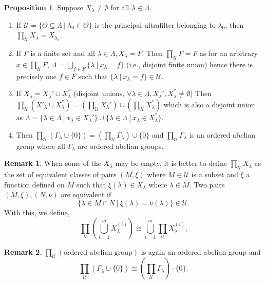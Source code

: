 \documentclass[10pt]{article}
\numberwithin{equation}{section}
\theoremstyle{definition}
\newtheorem{proposition}{Proposition}[subsection]
\newtheorem{remark}{Remark}[subsection]
\newcommand{\U}[0]{\mathcal{U}}
\newcommand{\sep}[0]{\:|\:}
\begin{document}
\begin{proposition}
    \label{fact_5_2}
    Suppose $X_\lambda\not=\emptyset$ for all $\lambda\in\Lambda$.
    \begin{enumerate}
        \item If $\U=\{\Theta\subseteq\Lambda\sep\lambda_0\in\Theta\}$ is the principal ultrafilter belonging to $\lambda_0$, then $\prod_\U X_\lambda=X_{\lambda_0}$.
        \item If $F$ is a finite set and all $\lambda\in\Lambda,X_\lambda=F$. Then $\prod_\U F = F$ as for an arbitrary $x\in\prod_\U F$, $\Lambda = \bigcup_{f\in F}\{\lambda\sep x_\lambda =f\}$ (i.e., disjoint finite union) hence there is precisely one $f\in F$ such that $\{\lambda\sep x_\lambda=f\}\in\U$.
        \item If $X_\lambda = X_\lambda'\cup X_\lambda^{''}$ (disjoint unions, $\forall \lambda\in\Lambda, X_\lambda',X^{''}_\lambda\not=\emptyset$) Then $\prod_{\U}(X'_\lambda\cup X^{''}_\lambda) = (\prod_\U X_\lambda')\cup(\prod_\U X^{''}_\lambda)$ which is also a disjoint union as $\Lambda = \{\lambda\in\Lambda\sep x_\lambda\in X_\lambda'\}\cup\{\lambda\in\Lambda\sep x_\lambda\in X_\lambda^{''}\}$.
        \item Then $\prod_\U(\Gamma_\lambda\cup\{0\}) = (\prod_\U\Gamma_\lambda)\cup\{0\}$ and $\prod_\U\Gamma_\lambda$ is an ordered abelian group where all $\Gamma_\lambda$ are ordered abelian groups.
    \end{enumerate}
\end{proposition}
\begin{remark}
    When some of the $X_\lambda$ may be empty, it is better to define $\prod_{\U}X_\lambda$ as the set of equivalent classes of pairs $(M,\xi)$ where $M\in\U$ is a subset and $\xi$ a function defined on $M$ such that $\xi(\lambda)\in X_\lambda$ where $\lambda\in M$. Two pairs $(M,\xi),(N,\nu)$ are equivalent if
    \begin{equation*}
        \{\lambda\in M\cap N\sep \xi(\lambda) = \nu(\lambda)\}\in\U.
    \end{equation*}
    With this, we define,
    \begin{equation*}
        \prod_\U\left(\bigcup_{i=1}^m X_\lambda^{(i)}\right)\cong \bigcup_{i=1}^m\prod_\U X_\lambda^{(i)}.
    \end{equation*}
\end{remark}
\begin{remark}
    $\prod_\U(\text{ordered abelian group})$ is again an ordered abelian group and
    \begin{equation*}
        \prod_\U (\Gamma_\lambda\cup\{0\}) \cong \left(\prod_\U\Gamma_\lambda\right)\cdot\{0\}.
    \end{equation*}
\end{remark}
\end{document}
